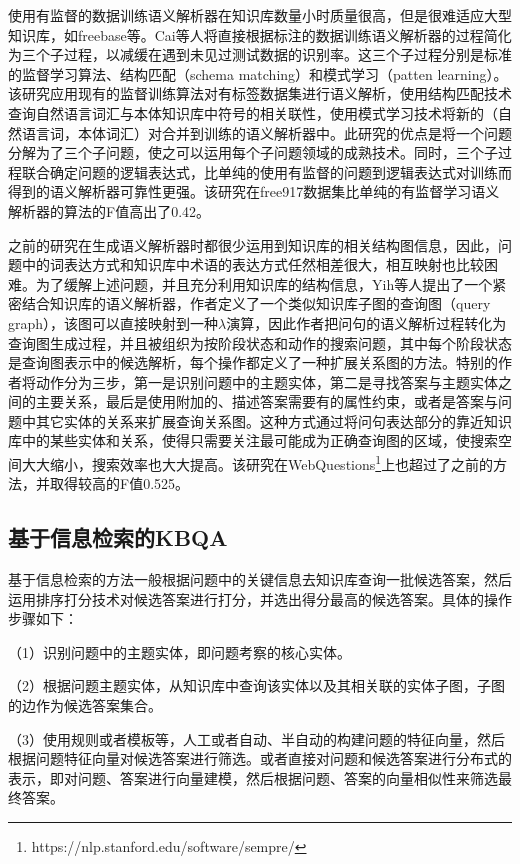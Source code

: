 使用有监督的数据训练语义解析器在知识库数量小时质量很高，但是很难适应大型知识库，如freebase等。Cai\cite{Cai}等人将直接根据标注的数据训练语义解析器的过程简化为三个子过程，以减缓在遇到未见过测试数据的识别率。这三个子过程分别是标准的监督学习算法、结构匹配（schema matching）和模式学习（patten learning）。该研究应用现有的监督训练算法对有标签数据集进行语义解析，使用结构匹配技术查询自然语言词汇与本体知识库中符号的相关联性，使用模式学习技术将新的（自然语言词，本体词汇）对合并到训练的语义解析器中。此研究的优点是将一个问题分解为了三个子问题，使之可以运用每个子问题领域的成熟技术。同时，三个子过程联合确定问题的逻辑表达式，比单纯的使用有监督的问题到逻辑表达式对训练而得到的语义解析器可靠性更强。该研究在free917数据集比单纯的有监督学习语义解析器的算法的F值高出了0.42。

之前的研究在生成语义解析器时都很少运用到知识库的相关结构图信息，因此，问题中的词表达方式和知识库中术语的表达方式任然相差很大，相互映射也比较困难。为了缓解上述问题，并且充分利用知识库的结构信息，Yih\cite{Yih}等人提出了一个紧密结合知识库的语义解析器，作者定义了一个类似知识库子图的查询图（query graph），该图可以直接映射到一种$\lambda$演算，因此作者把问句的语义解析过程转化为查询图生成过程，并且被组织为按阶段状态和动作的搜索问题，其中每个阶段状态是查询图表示中的候选解析，每个操作都定义了一种扩展关系图的方法。特别的作者将动作分为三步，第一是识别问题中的主题实体，第二是寻找答案与主题实体之间的主要关系，最后是使用附加的、描述答案需要有的属性约束，或者是答案与问题中其它实体的关系来扩展查询关系图。这种方式通过将问句表达部分的靠近知识库中的某些实体和关系，使得只需要关注最可能成为正确查询图的区域，使搜索空间大大缩小，搜索效率也大大提高。该研究在WebQuestions\footnote{https://nlp.stanford.edu/software/sempre/}上也超过了之前的方法，并取得较高的F值0.525。

\subsection{基于信息检索的KBQA}
基于信息检索的方法一般根据问题中的关键信息去知识库查询一批候选答案，然后运用排序打分技术对候选答案进行打分，并选出得分最高的候选答案。具体的操作步骤如下：

（1）识别问题中的主题实体，即问题考察的核心实体。

（2）根据问题主题实体，从知识库中查询该实体以及其相关联的实体子图，子图的边作为候选答案集合。

（3）使用规则或者模板等，人工或者自动、半自动的构建问题的特征向量，然后根据问题特征向量对候选答案进行筛选。或者直接对问题和候选答案进行分布式的表示，即对问题、答案进行向量建模，然后根据问题、答案的向量相似性来筛选最终答案。

